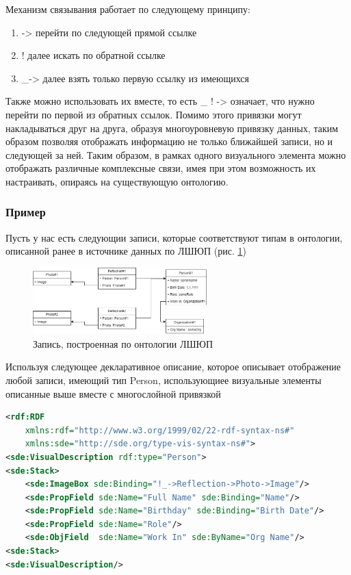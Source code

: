 \documentclass[12pt]{article}
\begin{document}
Механизм связывания работает по следующему принципу:
\begin{enumerate}
    \item -> перейти по следующей прямой ссылке
    \item ! далее искать по обратной ссылке
    \item \_-> далее взять только первую ссылку из имеющихся
\end{enumerate}

Также можно использовать их вместе, то есть \_ ! -> означает, что нужно перейти по первой из обратных ссылок. Помимо этого привязки могут накладываться друг на друга, образуя многоуровневую привязку данных, таким образом позволяя отображать информацию не только ближайшей записи, но и следующей за ней. Таким образом, в рамках одного визуального элемента можно отображать различные комплексные связи, имея при этом возможность их настраивать, опираясь на существующую онтологию.

\subsubsection{Пример}

Пусть у нас есть следующии записи, которые соответствуют типам в онтологии, описанной ранее в источнике данных по ЛШЮП (рис. \ref{fig:person_records})

\begin{figure}[!ht]
    \centering
    \includegraphics[width=0.6\textwidth]{_images/working_rdf.png}
    \caption{Запись, построенная по онтологии ЛШЮП}
    \label{fig:person_records}
\end{figure}

Используя следующее декларативное описание, которое описывает отображение любой записи, имеющий тип Person, использующиее визуальные элементы описанные выше вместе с многослойной привязкой

\begin{lstlisting}[language=XML]
<rdf:RDF
    xmlns:rdf="http://www.w3.org/1999/02/22-rdf-syntax-ns#"
    xmlns:sde="http://sde.org/type-vis-syntax-ns#">
<sde:VisualDescription rdf:type="Person">
<sde:Stack>
    <sde:ImageBox sde:Binding="!_->Reflection->Photo->Image"/>
    <sde:PropField sde:Name="Full Name" sde:Binding="Name"/>
    <sde:PropField sde:Name="Birthday" sde:Binding="Birth Date"/>
    <sde:PropField sde:Name="Role"/>
    <sde:ObjField  sde:Name="Work In" sde:ByName="Org Name"/>
<sde:Stack>
<sde:VisualDescription/>
\end{lstlisting}
\end{document}
